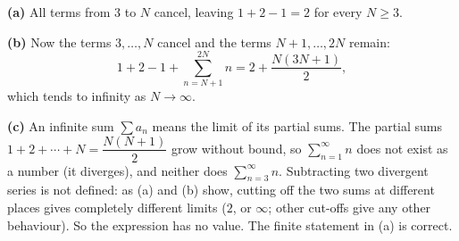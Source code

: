 \textbf{(a)} All terms from $3$ to $N$ cancel, leaving $1+2-1=\boxed{2}$ for every $N\ge3$.

\textbf{(b)} Now the terms $3,\dots,N$ cancel and the terms $N+1,\dots,2N$ remain:
\[1+2-1+\sum_{n=N+1}^{2N}n=2+\dfrac{N(3N+1)}{2},\]
which tends to infinity as $N\to\infty$.

\textbf{(c)} An infinite sum $\sum a_n$ means the limit of its partial sums. The partial sums $1+2+\cdots+N=\dfrac{N(N+1)}2$ grow without bound, so $\sum_{n=1}^{\infty}n$ does not exist as a number (it diverges), and neither does $\sum_{n=3}^{\infty}n$. Subtracting two divergent series is not defined: as (a) and (b) show, cutting off the two sums at different places gives completely different limits ($2$, or $\infty$; other cut-offs give any other behaviour). So the expression has no value. The finite statement in (a) is correct.
